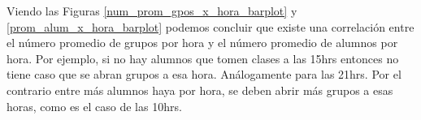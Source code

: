 Viendo las Figuras \ref{num_prom_gpos_x_hora_barplot} y \ref{prom_alum_x_hora_barplot} podemos concluir que existe una correlación entre el número promedio de grupos por hora y el número promedio de alumnos por hora. Por ejemplo, si no hay alumnos que tomen clases a las 15hrs entonces no tiene caso que se abran grupos a esa hora. Análogamente para las 21hrs. Por el contrario entre más alumnos haya por hora, se deben abrir más grupos a esas horas, como es el caso de las 10hrs.